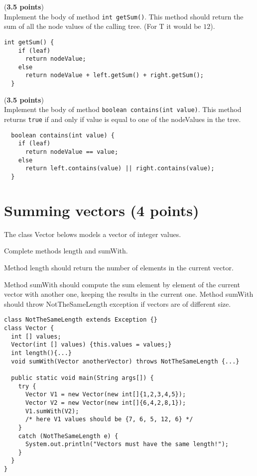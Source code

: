 \documentclass[correction]{exercices}
\begin{document}
\begin{question} (\textbf{3.5 points})\\
Implement the body of method \lstinline!int getSum()!.
This method should return the sum of all the node values of the calling tree.
(For T it would be $12$).

\begin{correction}
\begin{verbatim}
int getSum() {
    if (leaf)
      return nodeValue;
    else
      return nodeValue + left.getSum() + right.getSum();
  }
\end{verbatim}
\end{correction}
\end{question}

\begin{question} (\textbf{3.5 points}) \\
Implement the body of method \lstinline!boolean contains(int value)!.
This method returns \lstinline!true! if and only if value is equal to one
of the nodeValues in the tree.

\begin{correction}
\begin{verbatim}
  boolean contains(int value) {
    if (leaf) 
      return nodeValue == value;
    else
      return left.contains(value) || right.contains(value);
  }
\end{verbatim}
\end{correction}
\end{question}

\section{Summing vectors (4 points)}

The class Vector belows models a vector of integer values.

Complete methods length and sumWith.

Method length should return the number of elements in the current vector.

Method sumWith should compute the sum element by element of the current 
vector with another one, keeping the results in the current one.
Method sumWith should throw NotTheSameLength exception if vectors are of
different size.

\begin{verbatim}
class NotTheSameLength extends Exception {}
class Vector {
  int [] values;
  Vector(int [] values) {this.values = values;}
  int length(){...}
  void sumWith(Vector anotherVector) throws NotTheSameLength {...}

  public static void main(String args[]) {
    try {
      Vector V1 = new Vector(new int[]{1,2,3,4,5});
      Vector V2 = new Vector(new int[]{6,4,2,8,1});
      V1.sumWith(V2);
      /* here V1 values should be {7, 6, 5, 12, 6} */
    }
    catch (NotTheSameLength e) {
      System.out.println("Vectors must have the same length!");
    }
  }
}
\end{verbatim}
\end{document}
